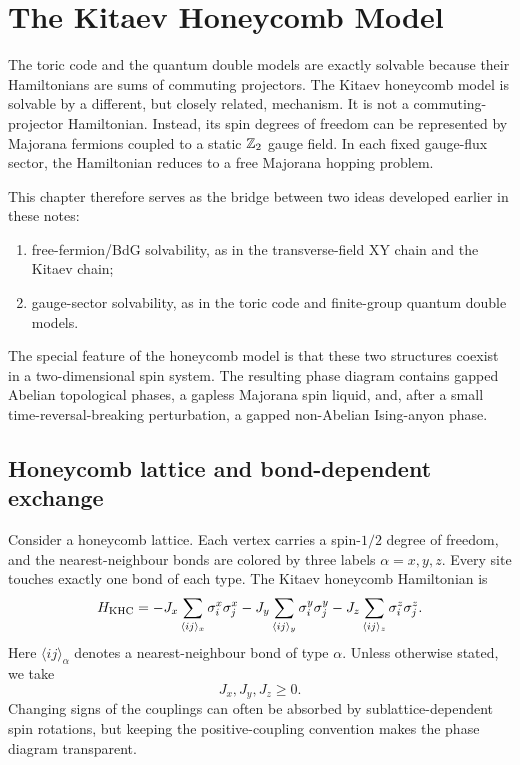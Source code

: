 \chapter{The Kitaev Honeycomb Model}
\label{chap:kitaev-honeycomb-model}

The toric code and the quantum double models are exactly solvable because their
Hamiltonians are sums of commuting projectors.  The Kitaev honeycomb model is
solvable by a different, but closely related, mechanism.  It is not a
commuting-projector Hamiltonian.  Instead, its spin degrees of freedom can be
represented by Majorana fermions coupled to a static \(\mathbb{Z}_2\) gauge field.  In
each fixed gauge-flux sector, the Hamiltonian reduces to a free Majorana hopping
problem.

This chapter therefore serves as the bridge between two ideas developed earlier
in these notes:
\begin{enumerate}[label=(\roman*)]
    \item free-fermion/BdG solvability, as in the transverse-field XY chain and
    the Kitaev chain;
    \item gauge-sector solvability, as in the toric code and finite-group
    quantum double models.
\end{enumerate}
The special feature of the honeycomb model is that these two structures coexist
in a two-dimensional spin system.  The resulting phase diagram contains gapped
Abelian topological phases, a gapless Majorana spin liquid, and, after a
small time-reversal-breaking perturbation, a gapped non-Abelian Ising-anyon
phase.

\section{Honeycomb lattice and bond-dependent exchange}
\label{sec:kitaev-honeycomb-hamiltonian}

Consider a honeycomb lattice.  Each vertex carries a spin-\(1/2\) degree of
freedom, and the nearest-neighbour bonds are colored by three labels
\(\alpha=x,y,z\).  Every site touches exactly one bond of each type.  The Kitaev
honeycomb Hamiltonian is
\begin{equation}
\label{eq:kitaev-honeycomb-spin-hamiltonian}
    H_{\rm KHC}
    =
    -J_x\sum_{\langle ij\rangle_x}\sigma_i^x\sigma_j^x
    -J_y\sum_{\langle ij\rangle_y}\sigma_i^y\sigma_j^y
    -J_z\sum_{\langle ij\rangle_z}\sigma_i^z\sigma_j^z .
\end{equation}
Here \(\langle ij\rangle_\alpha\) denotes a nearest-neighbour bond of type
\(\alpha\).  Unless otherwise stated, we take
\begin{equation}
\label{eq:kitaev-couplings-positive}
    J_x,J_y,J_z\geq0 .
\end{equation}
Changing signs of the couplings can often be absorbed by sublattice-dependent
spin rotations, but keeping the positive-coupling convention makes the phase
diagram transparent.

